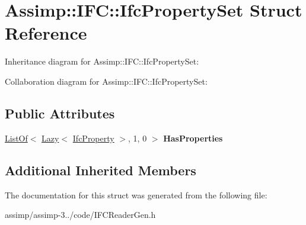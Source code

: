 \hypertarget{struct_assimp_1_1_i_f_c_1_1_ifc_property_set}{\section{Assimp\+:\+:I\+F\+C\+:\+:Ifc\+Property\+Set Struct Reference}
\label{struct_assimp_1_1_i_f_c_1_1_ifc_property_set}
}


Inheritance diagram for Assimp\+:\+:I\+F\+C\+:\+:Ifc\+Property\+Set\+:


Collaboration diagram for Assimp\+:\+:I\+F\+C\+:\+:Ifc\+Property\+Set\+:
\subsection*{Public Attributes}
\begin{DoxyCompactItemize}
\item 
\hypertarget{struct_assimp_1_1_i_f_c_1_1_ifc_property_set_ae6218744efb948f9c03eff93dbcf58d8}{\hyperlink{struct_assimp_1_1_s_t_e_p_1_1_list_of}{List\+Of}$<$ \hyperlink{struct_assimp_1_1_s_t_e_p_1_1_lazy}{Lazy}$<$ \hyperlink{struct_assimp_1_1_i_f_c_1_1_ifc_property}{Ifc\+Property} $>$, 1, 0 $>$ {\bfseries Has\+Properties}}\label{struct_assimp_1_1_i_f_c_1_1_ifc_property_set_ae6218744efb948f9c03eff93dbcf58d8}

\end{DoxyCompactItemize}
\subsection*{Additional Inherited Members}


The documentation for this struct was generated from the following file\+:\begin{DoxyCompactItemize}
\item 
assimp/assimp-\/3../code/I\+F\+C\+Reader\+Gen.\+h\end{DoxyCompactItemize}
